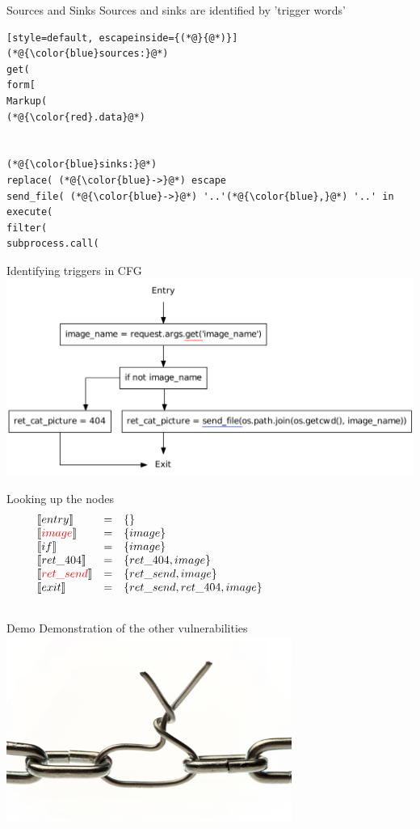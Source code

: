 \begin{frame}[fragile]{Sources and Sinks}
  Sources and sinks are identified by 'trigger words'
  \begin{lstlisting}[style=default, escapeinside={(*@}{@*)}]
(*@{\color{blue}sources:}@*)
get(
form[
Markup(
(*@{\color{red}.data}@*)


(*@{\color{blue}sinks:}@*)
replace( (*@{\color{blue}->}@*) escape
send_file( (*@{\color{blue}->}@*) '..'(*@{\color{blue},}@*) '..' in
execute(
filter(
subprocess.call(
\end{lstlisting}

\end{frame}

\begin{frame}{Identifying triggers in CFG}
  \includegraphics[width=1.05\textwidth]{graphics/cfg_path_traversal_triggers}
\end{frame}

\begin{frame}{Looking up the nodes}
\[
\begin{array}{lclcl}
  \constraint{entry} & = & \{\} &&\\
  \assignconstraint{image} & = & \{image\} &&\\
  \constraint{if} & = & \{image\} &&\\
  \constraint{ret\_404} & = & \{ret\_404, image\} &&\\
  \assignconstraint{ret\_send} & = & \{ret\_send, image\} &&\\
  \constraint{exit} & = & \{ret\_send, ret\_404, image\} &&\\
  && \phantom{\{command, param\}} && \phantom{\{command, param\}}
\end{array}
\]
\end{frame}


\begin{frame}{Demo}
  \centering
    Demonstration of the other vulnerabilities
    \includegraphics[width=0.7\textwidth]{graphics/vulnerability}
\end{frame}


